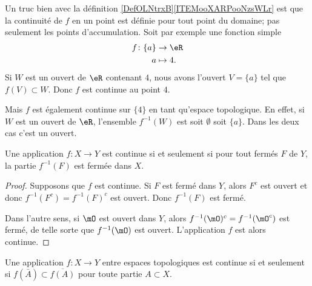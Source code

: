 \begin{example}
	Un truc bien avec la définition \ref{DefOLNtrxB}\ref{ITEMooXARPooNzsWLr} est que la continuité de \( f\) en un point est définie pour tout point du domaine; pas seulement les points d'accumulation. Soit par exemple une fonction simple
	\begin{equation}
		\begin{aligned}
			f\colon \{a\} & \to \eR    \\
			a             & \mapsto 4.
		\end{aligned}
	\end{equation}
	Si \( W\) est un ouvert de \( \eR\) contenant \( 4\), nous avons l'ouvert \( V=\{a\}\) tel que \( f(V)\subset W\). Donc \( f\) est continue au point \( 4\).

	Mais \( f\) est également continue sur \( \{4\}\) en tant qu'espace topologique. En effet, si \( W\) est un ouvert de \( \eR\), l'ensemble \( f^{-1}(W)\) est soit \( \emptyset\) soit \( \{a\}\). Dans les deux cas c'est un ouvert.
\end{example}

\begin{lemma}       \label{LEMooATLRooEKnlro}
	Une application \( f\colon X\to Y\) est continue si et seulement si pour tout fermés \( F\) de \( Y\), la partie \(f^{-1}(F) \) est fermée dans \( X\).
\end{lemma}

\begin{proof}
	Supposons que \( f\) est continue. Si \( F\) est fermé dans \( Y\), alors \( F^c\) est ouvert et donc \( f^{-1}(F^c)=f^{-1}(F)^c\) est ouvert. Donc \( f^{-1}(F)\) est fermé.

	Dans l'autre sens, si \( \mO\) est ouvert dans \( Y\), alors \( f^{-1}(\mO)^c=f^{-1}(\mO^c)\) est fermé, de telle sorte que \( f^{-1}(\mO)\) est ouvert. L'application \( f\) est alors continue.
\end{proof}

\begin{proposition}	\label{PROPooXGBEooZRVkSc}
	Une application \(f \colon X\to Y  \) entre espaces topologiques est continue si et seulement si \( f(\bar A)\subset\overline{f(A)}\) pour toute partie \( A\subset X\).
\end{proposition}


